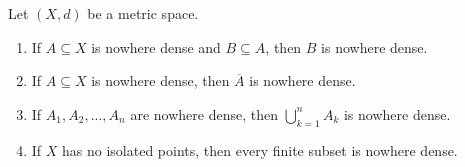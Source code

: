     \begin{proposition}
        Let $(X,d)$ be a metric space.
        \begin{enumerate}[label = (\arabic*),itemsep=1pt,topsep=3pt]
            \item If $A \subseteq X$ is nowhere dense and $B \subseteq A$, then $B$ is nowhere dense.
            \item If $A \subseteq X$ is nowhere dense, then $\overline{A}$ is nowhere dense.
            \item If $A_1,A_2,...,A_n$ are nowhere dense, then $\bigcup_{k = 1}^n A_k$ is nowhere dense.
            \item If $X$ has no isolated points, then every finite subset is nowhere dense.
        \end{enumerate}
    \end{proposition}
